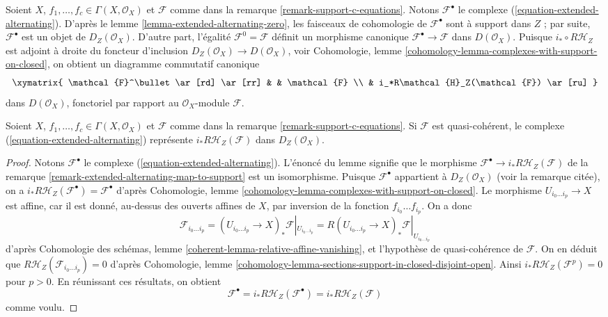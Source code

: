 \begin{remark}
\label{remark-extended-alternating-map-to-support}
Soient $X$, $f_1, \ldots, f_c \in \Gamma(X, \mathcal{O}_X)$ et
$\mathcal{F}$ comme dans la remarque \ref{remark-support-c-equations}.
Notons $\mathcal{F}^\bullet$ le complexe
(\ref{equation-extended-alternating}). D'après
le lemme \ref{lemma-extended-alternating-zero},
les faisceaux de cohomologie de $\mathcal{F}^\bullet$
sont à support dans $Z$ ; par suite, $\mathcal{F}^\bullet$ est un objet de
$D_Z(\mathcal{O}_X)$. D'autre part, l'égalité
$\mathcal{F}^0 = \mathcal{F}$ définit un morphisme canonique
$\mathcal{F}^\bullet \to \mathcal{F}$ dans $D(\mathcal{O}_X)$.
Puisque $i_* \circ R\mathcal{H}_Z$ est adjoint à droite du
foncteur d'inclusion $D_Z(\mathcal{O}_X) \to D(\mathcal{O}_X)$, voir
Cohomologie, lemme \ref{cohomology-lemma-complexes-with-support-on-closed},
on obtient un diagramme commutatif canonique
$$
\xymatrix{
\mathcal{F}^\bullet \ar[rd] \ar[rr] & & \mathcal{F} \\
& i_*R\mathcal{H}_Z(\mathcal{F}) \ar[ru]
}
$$
dans $D(\mathcal{O}_X)$, fonctoriel par rapport au $\mathcal{O}_X$-module $\mathcal{F}$.
\end{remark}

\begin{lemma}
\label{lemma-extended-alternating-represented}
Soient $X$, $f_1, \ldots, f_c \in \Gamma(X, \mathcal{O}_X)$ et
$\mathcal{F}$ comme dans la remarque \ref{remark-support-c-equations}.
Si $\mathcal{F}$ est quasi-cohérent, le complexe
(\ref{equation-extended-alternating}) représente
$i_* R\mathcal{H}_Z(\mathcal{F})$ dans $D_Z(\mathcal{O}_X)$.
\end{lemma}

\begin{proof}
Notons $\mathcal{F}^\bullet$ le complexe
(\ref{equation-extended-alternating}).
L'énoncé du lemme signifie que le morphisme
$\mathcal{F}^\bullet \to i_*R\mathcal{H}_Z(\mathcal{F})$
de la remarque \ref{remark-extended-alternating-map-to-support}
est un isomorphisme. Puisque $\mathcal{F}^\bullet$ appartient à
$D_Z(\mathcal{O}_X)$ (voir la remarque citée), on a
$i_*R\mathcal{H}_Z(\mathcal{F}^\bullet) = \mathcal{F}^\bullet$
d'après Cohomologie, lemme \ref{cohomology-lemma-complexes-with-support-on-closed}.
Le morphisme $U_{i_0 \ldots i_p} \to X$ est affine,
car il est donné, au-dessus des ouverts affines de $X$, par inversion de la fonction
$f_{i_0} \ldots f_{i_p}$. On a donc
$$
\mathcal{F}_{i_0 \ldots i_p} =
(U_{i_0 \ldots i_p} \to X)_*\mathcal{F}|_{U_{i_0 \ldots i_p}} =
R(U_{i_0 \ldots i_p} \to X)_*\mathcal{F}|_{U_{i_0 \ldots i_p}}
$$
d'après Cohomologie des schémas, lemme \ref{coherent-lemma-relative-affine-vanishing},
et l'hypothèse de quasi-cohérence de $\mathcal{F}$. On en déduit que
$R\mathcal{H}_Z(\mathcal{F}_{i_0 \ldots i_p}) = 0$ d'après Cohomologie, lemme
\ref{cohomology-lemma-sections-support-in-closed-disjoint-open}.
Ainsi $i_*R\mathcal{H}_Z(\mathcal{F}^p) = 0$ pour $p > 0$.
En réunissant ces résultats, on obtient
$$
\mathcal{F}^\bullet = i_*R\mathcal{H}_Z(\mathcal{F}^\bullet) =
i_*R\mathcal{H}_Z(\mathcal{F})
$$
comme voulu.
\end{proof}

